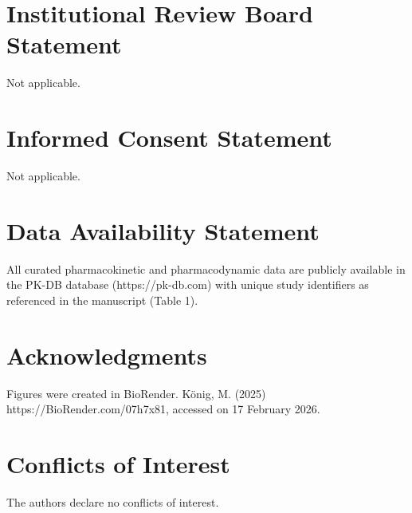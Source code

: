 {\section{Institutional Review Board Statement}
Not applicable.
\section{Informed Consent Statement}
Not applicable.
\section{Data Availability Statement}
All curated pharmacokinetic and pharmacodynamic data are publicly available in the PK-DB database (https://pk-db.com) with unique study identifiers as referenced in the manuscript (Table 1).
\section{Acknowledgments}
Figures were created in BioRender. König, M. (2025) https://BioRender.com/07h7x81, accessed on 17 February 2026.
\section{Conflicts of Interest}
The authors declare no conflicts of interest.}